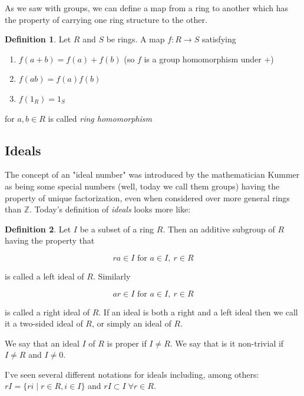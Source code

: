 \documentclass{article}
\theoremstyle{definition}
\newtheorem{definition}{Definition}[section]
\begin{document}
\bigskip
\noindent
As we saw with groups, we can define a map from a ring to another
which has the property of carrying one ring structure to the
other. 

\bigskip
\begin{definition}
Let $R$ and $S$ be rings. A map $f : R \rightarrow S$  satisfying
\begin{enumerate}
\item $f(a + b) = f(a) + f(b)$  (so $f$ is a group homomorphism under +)
\item $f(ab) = f(a)f(b)$
\item $f(1_R) = 1_S$
\end{enumerate}
for $a, b \in R$ is called \emph{ring homomorphism}
\end{definition}

\subsection{Ideals}
The concept of an "ideal number" was introduced by the
mathematician Kummer as being some special numbers (well, today
we call them groups) having the property of unique factorization,
even when considered over more general rings than
$\mathbb{Z}$. Today's definition of \emph{ideals} looks more
like:

\begin{definition}
Let $I$ be a subset of a ring $R$. Then an additive subgroup of
$R$ having the property that 

\medskip
\begin{equation*}
ra \in I \text{ for }  a \in I, \: r \in R
\end{equation*}

\medskip
\noindent
is called a left ideal of $R$.  Similarly

\medskip
\begin{equation*}
ar \in I  \text{ for }  a \in I, \: r \in R
\end{equation*}

\bigskip
\noindent
is called a right ideal of $R$. If an ideal is both a right and a
left ideal then we call it a two-sided ideal of $R$, or simply an
ideal of $R$. 
\end{definition}

\noindent
We say that an ideal $I$ of $R$ is proper if $I \neq R$.  We say
that is it non-trivial if $I \neq R$ and  $I \neq  0$. 

\bigskip
\noindent
I've seen several different notations for ideals including, among
others:  $rI = \{ri \mid r \in R, i \in I\}$ and $rI \subset I \;
\forall r \in R$.  
\end{document}
